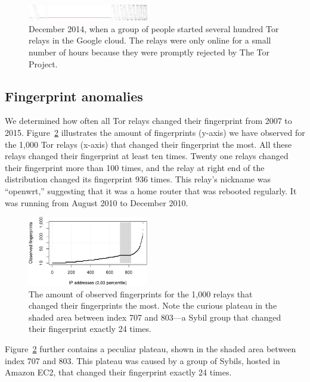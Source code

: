 \begin{figure}[t]
	\centering
	\includegraphics[width=0.47\textwidth]{diagrams/lizard-uptimes.jpg}
	\caption{December 2014, when a group of people started several hundred Tor
	relays in the Google cloud.  The relays were only online for a small number
	of hours because they were promptly rejected by The Tor Project.}
	\label{fig:2014-12-lizard}
\end{figure}

\subsection{Fingerprint anomalies}
\label{sec:fingerprint-anomalies}
We determined how often all Tor relays changed their fingerprint from 2007 to
2015.  Figure~\ref{fig:fingerprints} illustrates the amount of fingerprints
(y-axis) we have observed for the 1,000 Tor relays (x-axis) that changed their
fingerprint the most.  All these relays changed their fingerprint at least ten
times.  Twenty one relays changed their fingerprint more than 100 times, and the
relay at right end of the distribution changed its fingerprint 936 times.  This
relay's nickname was ``openwrt,'' suggesting that it was a home router that was
rebooted regularly.  It was running from August 2010 to December 2010.

\begin{figure}[t]
	\centering
	\includegraphics[width=0.47\textwidth]{diagrams/fingerprints.pdf}
	\caption{The amount of observed fingerprints for the 1,000 relays that
	changed their fingerprints the most.  Note the curious plateau in the shaded
	area between index 707 and 803---a Sybil group that changed their
	fingerprint exactly 24 times.}
	\label{fig:fingerprints}
\end{figure}

Figure~\ref{fig:fingerprints} further contains a peculiar plateau, shown in the
shaded area between index 707 and 803.  This plateau was caused by a group of
Sybils, hosted in Amazon EC2, that changed their fingerprint exactly 24 times.


